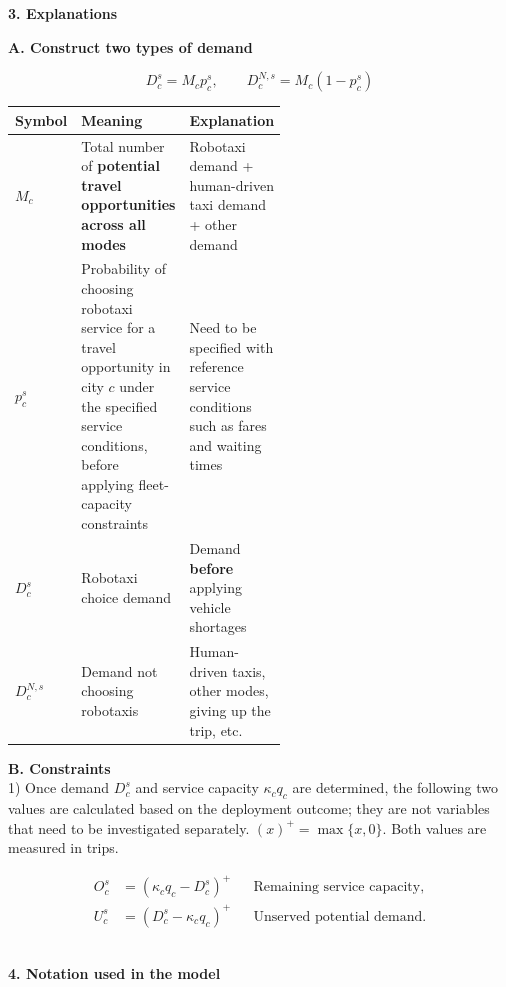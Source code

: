 \documentclass[10pt,a4paper]{article}
\newcommand{\hd}[1]{\par\vspace{8pt}\textbf{#1}\par\vspace{3pt}}
\begin{document}

\hd{3. Explanations}

\textbf{A. Construct two types of demand }

\[
D_c^s = M_c p_c^s,\qquad 
D_c^{N,s}= M_c (1-p_c^s)
\]

{\small
\begin{tabularx}{\linewidth}{@{}>{\raggedright\arraybackslash}p{0.12\linewidth}>{\raggedright\arraybackslash}p{0.42\linewidth}Y@{}}
\toprule
Symbol & Meaning & Explanation \\ \midrule
$M_c$ &Total number of \textbf{potential travel opportunities across all modes} & Robotaxi demand + human-driven taxi demand + other demand \\
$p_c^s$ & Probability of choosing robotaxi service for a travel opportunity
in city $c$ under the specified service conditions,
before applying fleet-capacity constraints & Need to be specified with reference service conditions such as fares and waiting times \\
$D_c^s$ & Robotaxi choice demand & Demand \textbf{before} applying vehicle shortages \\
$D_c^{N,s}$ & Demand not choosing robotaxis & Human-driven taxis, other modes, giving up the trip, etc. \\
\bottomrule
\end{tabularx}
}

\textbf{B. Constraints}\\
1) Once demand $D_c^s$ and service capacity $\kappa_c q_c$ are determined, the following two values are calculated based on the deployment outcome; they are not variables that need to be investigated separately. $(x)^+=\max\{x,0\}$. Both values are measured in trips.

\[
\begin{aligned}
O_c^s&=(\kappa_c q_c-D_c^s)^+&&\text{Remaining service capacity},\\
U_c^s&=(D_c^s-\kappa_c q_c)^+&&\text{Unserved potential demand}.
\end{aligned}
\]\\

\newpage
\hd{4. Notation used in the model}
\end{document}

